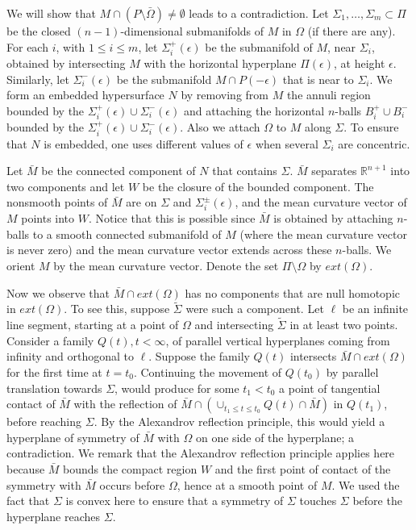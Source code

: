 \documentclass[11pt]{amsart}
\theoremstyle{plain}
\numberwithin{equation}{section}
\numberwithin{theorem}{section}
\begin{document}
We will show that $M\cap(P\setminus \bar\Omega)\neq \emptyset $ leads to a contradiction. Let $\Sigma_1,\ldots,\Sigma_m\subset \Pi$ be the closed $(n-1)$-dimensional submanifolds of $M$ in $\Omega$ (if there are any).
For each $i$, with $1\leq i\leq m$, let $\Sigma^+_i(\epsilon)$ be the submanifold of $M$, near $\Sigma_i$, obtained by intersecting $M$ with the horizontal hyperplane $\Pi(\epsilon)$, at height $\epsilon$. Similarly, let $\Sigma^-_i (\epsilon)$ be the submanifold $M\cap P(-\epsilon)$ that is near to $\Sigma_i$. We form an embedded hypersurface $N$ by removing from $M$ the annuli region bounded by the $\Sigma^+_i(\epsilon)\cup \Sigma^-_i(\epsilon)$ and attaching the horizontal  $n$-balls $B^+_i\cup B^-_i$ bounded
by the $\Sigma^+_i(\epsilon)\cup \Sigma^-_i(\epsilon)$. Also we attach $\Omega$ to $M$ along $\Sigma$. To ensure that $N$ is embedded, one uses different values of $\epsilon$ when several $\Sigma_i$ are concentric. 

Let $\bar M$ be the connected component of $N$ that contains $\Sigma$. $\bar M$ separates $\mathbb R^{n+1}$ into two components and let $W$ be the closure of the bounded component. The nonsmooth points of $\bar M$ are on $\Sigma$ and  $\Sigma^{\pm}_i(\epsilon)$, and the mean curvature vector of $M$ points into $W$. Notice that this is possible since $\bar M$ is obtained by attaching $n$-balls to a smooth connected submanifold of $M$ (where the mean curvature vector is never zero) and the mean curvature vector extends across these $n$-balls. We orient $M$ by the mean curvature vector. Denote the set $\Pi\setminus \Omega$ by $ext(\Omega)$. 

Now we observe that $\bar M\cap  ext(\Omega)$ has no components that
are null homotopic in $ext(\Omega)$. To see this, suppose $\tilde\Sigma$ were such a component. Let $\ell$ be an infinite line segment, starting at a point of $\Omega$ and intersecting  $\tilde\Sigma$ in at least two points. Consider a family $Q(t), t<\infty$, of parallel vertical hyperplanes coming from infinity and orthogonal to $\ell$. Suppose the family $Q(t)$ intersects $\bar M\cap ext(\Omega)$ for the first time at $t=t_0$.
Continuing the movement of $Q(t_0)$ by parallel translation towards $\Sigma$, would produce for some $t_1 < t_0$ a point of tangential contact of $\bar M$ with the reflection of $\bar M\cap \left(\cup_{t_{1}\leq t\leq t_{0}} Q(t) \cap \bar M\right)$ in $Q(t_1)$, before reaching $\Sigma$. By the Alexandrov reflection principle, this would yield a hyperplane of symmetry of $\bar M$ with $\Omega$ on one side of the hyperplane; a contradiction. We remark that the Alexandrov reflection principle applies here because $\bar M$ bounds the compact region $W$ and the first point of contact of the symmetry with $\bar M$ occurs before $\Omega$, hence at a smooth point of $M$. We used the fact that $\Sigma$ is convex here to ensure that a symmetry of $\Sigma$ touches $\Sigma$ before the hyperplane reaches $\Sigma$.
\end{document}

